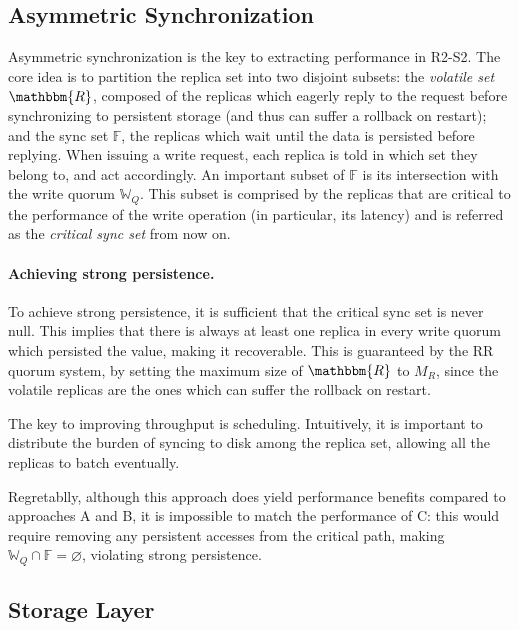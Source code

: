 \subsection{Asymmetric Synchronization}\label{ssec:asymmetric_synchronization}

Asymmetric synchronization is the key to extracting performance
in \ac{R2-S2}. The core idea is to partition the replica set
into two disjoint subsets: the \emph{volatile set}
$\mathbbm{R}$, composed of the replicas which eagerly reply to the
request before synchronizing to persistent storage (and thus can
suffer a rollback on restart); and the sync set $\mathbb{F}$, the
replicas which wait until the data is persisted before replying.
When issuing a write request, each replica is told in which set
they belong to, and act accordingly. An important subset of
$\mathbb{F}$ is its intersection with the write quorum
$\mathbb{W}_Q$. This subset is comprised by the replicas that are
critical to the performance of the write operation (in
particular, its latency) and is referred as the \emph{critical
sync set} from now on.

\paragraph{Achieving strong persistence.} To achieve strong
persistence, it is sufficient that the critical sync set is
never null. This implies that there is always at least one
replica in every write quorum which persisted the value, making
it recoverable. This is guaranteed by the \ac{RR} quorum
system, by setting the maximum size of $\mathbbm{R}$ to $M_R$,
since the volatile replicas are the ones which can suffer the rollback on
restart.

The key to improving throughput is scheduling. Intuitively, it is
important to distribute the burden of syncing to disk among the
replica set, allowing all the replicas to batch eventually.

Regretablly, although this approach does yield performance
benefits compared to approaches A and B, it is impossible to
match the performance of C\@: this would require removing any
persistent accesses from the critical path, making $\mathbb{W}_Q
\cap \mathbb{F} = \varnothing$, violating strong persistence.


\subsection{Storage Layer}\label{ssec:storage}

